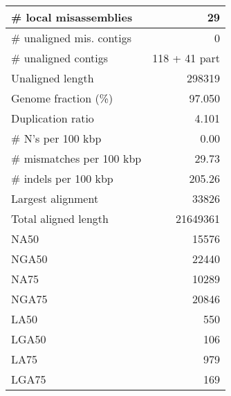 \documentclass[12pt,a4paper]{article}
\begin{document}
\begin{table}[ht]
\begin{center}
\begin{tabular}{|l*{1}{|r}|}
\# local misassemblies & 29 \\ \hline
\# unaligned mis. contigs & 0 \\ \hline
\# unaligned contigs & 118 + 41 part \\ \hline
Unaligned length & 298319 \\ \hline
Genome fraction (\%) & 97.050 \\ \hline
Duplication ratio & 4.101 \\ \hline
\# N's per 100 kbp & 0.00 \\ \hline
\# mismatches per 100 kbp & 29.73 \\ \hline
\# indels per 100 kbp & 205.26 \\ \hline
Largest alignment & 33826 \\ \hline
Total aligned length & 21649361 \\ \hline
NA50 & 15576 \\ \hline
NGA50 & 22440 \\ \hline
NA75 & 10289 \\ \hline
NGA75 & 20846 \\ \hline
LA50 & 550 \\ \hline
LGA50 & 106 \\ \hline
LA75 & 979 \\ \hline
LGA75 & 169 \\ \hline
\end{tabular}
\end{center}
\end{table}
\end{document}
